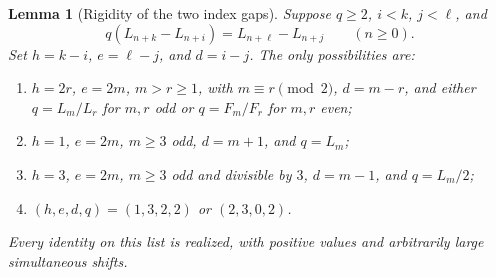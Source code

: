 \documentclass[11pt]{article}
\newtheorem{lemma}[theorem]{Lemma}
\begin{document}
\begin{lemma}[Rigidity of the two index gaps]\label{lem:gap-rigidity}
Suppose \(q\ge2\), \(i<k\), \(j<\ell\), and
\begin{equation}\label{eq:stationary-difference}
q(L_{n+k}-L_{n+i})=L_{n+\ell}-L_{n+j}
\qquad(n\ge0).
\end{equation}
Set \(h=k-i\), \(e=\ell-j\), and \(d=i-j\).
The only possibilities are:
\begin{enumerate}
\item \(h=2r\), \(e=2m\), \(m>r\ge1\), with
 \(m\equiv r\pmod2\), \(d=m-r\), and either
 \(q=L_m/L_r\) for \(m,r\) odd or \(q=F_m/F_r\)
 for \(m,r\) even;
\item \(h=1\), \(e=2m\), \(m\ge3\) odd,
 \(d=m+1\), and \(q=L_m\);
\item \(h=3\), \(e=2m\), \(m\ge3\) odd and divisible
 by \(3\), \(d=m-1\), and \(q=L_m/2\);
\item \((h,e,d,q)=(1,3,2,2)\) or \((2,3,0,2)\).
\end{enumerate}
Every identity on this list is realized, with positive
values and arbitrarily large simultaneous shifts.
\end{lemma}
\end{document}
